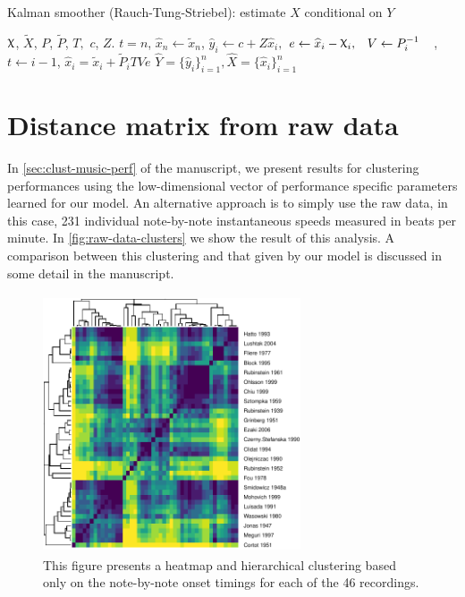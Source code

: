 \documentclass[aoas]{imsart}
\renewcommand{\hat}{\widehat}
\DeclareRobustCommand{\varx}{{\mathpalette\irchi\relax}}
\newcommand{\irchi}[2]{\protect\raisebox{\depth}{$#1\upchi$}}
\begin{document}
\begin{algorithm}
  \caption{Kalman smoother (Rauch-Tung-Striebel): estimate $\hat{X}$ conditional on
    $Y$\label{alg:kalman-smoother}} 
  \begin{algorithmic}
     $\varx$, $\widetilde{X}$, $P$, $\widetilde{P}$,
    $T,$ $c$, $Z$.
    \STATE $t=n$,
    \STATE $\hat{x}_{n}\leftarrow \widetilde{x}_n$, 
    \STATE $\hat{y}_i \leftarrow c + Z\hat{x}_i,$
    \STATE $\begin{aligned} e &\leftarrow \hat{x}_i -
      \varx_i, & V &\leftarrow P_i^{-1}\end{aligned}$,
    \STATE $t\leftarrow i-1$, 
    \STATE $\hat{x}_i = \widetilde{x}_i + \widetilde{P}_i T Ve $ 
    \ENDWHILE
    \RETURN $\widehat{Y}=\{\hat{y}_i\}_{i=1}^n, \hat{X}=\{\hat{x}_i\}_{i=1}^n$
  \end{algorithmic}
\end{algorithm}

\hypertarget{distance-matrix-from-raw-data}{%
\section{Distance matrix from raw
data}\label{distance-matrix-from-raw-data}}

In \autoref{sec:clust-music-perf} of the manuscript, we present results
for clustering performances using the low-dimensional vector of
performance specific parameters learned for our model. An alternative
approach is to simply use the raw data, in this case, 231 individual
note-by-note instantaneous speeds measured in beats per minute. In
\autoref{fig:raw-data-clusters} we show the result of this analysis. A
comparison between this clustering and that given by our model is
discussed in some detail in the manuscript.

\begin{figure}[b]

{\centering \includegraphics[width=3in,height=3in]{gfx/raw-data-clusters-1} 

}

\caption{This figure presents a heatmap and hierarchical clustering based only on the note-by-note onset timings for each of the 46 recordings.}\label{fig:raw-data-clusters}
\end{figure}
\end{document}
